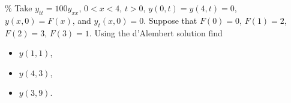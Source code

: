 \documentclass{ximera}
\begin{document}
\begin{exercise}\%
    Take $y_{tt} = 100y_{xx}$, $0 < x < 4$, $t > 0$, $y(0,t) = y(4, t) = 0$, $y(x,0) = F(x)$, and $y_t(x,0) = 0$. Suppose that $F(0)=0$, $F(1)=2$, $F(2)=3$, $F(3)=1$. Using the d'Alembert solution find
    \begin{itemize}
        \item $y(1,1)$,
        \item $y(4,3)$,
        \item $y(3,9)$.
    \end{itemize}
\end{exercise}
%
\end{document}
